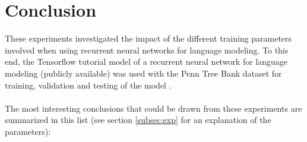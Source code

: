 \documentclass[10pt,a4paper,titlepage]{article}
\begin{document}
%
%
%

\section{Conclusion}

These experiments investigated the impact of the different training parameters involved when using recurrent neural networks for language modeling. To this end, the Tensorflow tutorial model of a recurrent neural network for language modeling (publicly available) was used with the Penn Tree Bank dataset for training, validation and testing of the model \cite{tensorflow}.\\
\\
The most interesting conclusions that could be drawn from these experiments are summarized in this list (see section \ref{subsec:exp} for an explanation of the parameters):
\end{document}
